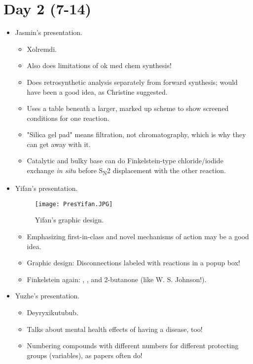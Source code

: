 \documentclass[../notes.tex]{subfiles}
\begin{document}
\section{Day 2 (7-14)}
\begin{itemize}
    \item {}Jasmin's presentation.
    \begin{itemize}
        \item Xolremdi.
        \item Also does limitations of ok med chem synthesis!
        \item Does retrosynthetic analysis separately from forward synthesis; would have been a good idea, as Christine suggested.
        \item Uses a table beneath a larger, marked up scheme to show screened conditions for one reaction.
        \item "Silica gel pad" means filtration, not chromatography, which is why they can get away with it.
        \item Catalytic  and bulky base can do Finkelstein-type chloride/iodide exchange \emph{in situ} before S\textsubscript{N}2 displacement with the other reaction.
    \end{itemize}
    \item Yifan's presentation.
    \begin{figure}[H]
        \centering
        \texttt{[image: PresYifan.JPG]}
        \caption{Yifan's graphic design.}
        \label{fig:PresYifan}
    \end{figure}
    \begin{itemize}
        \item Emphasizing first-in-class and novel mechanisms of action may be a good idea.
        \item Graphic design: Disconnections labeled with reactions in a popup box!
        \item Finkelstein again: , , and 2-butanone (like W. S. Johnson!).
    \end{itemize}
    \item Yuzhe's presentation.
    \begin{itemize}
        \item Deyryxikutubub.
        \item Talks about mental health effects of having a disease, too!
        \item Numbering compounds with different numbers for different protecting groups (variables), as papers often do!

\end{itemize}
\end{itemize}
\end{document}
